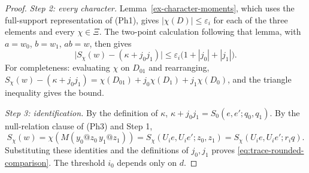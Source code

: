 \begin{proof}
\emph{Step 2: every character.} Lemma~\ref{ex-character-moments}, which
uses the full-support representation of (Ph1), gives
$|\chi(D)|\le\varepsilon_i$ for each of the three elements and every
$\chi\in\Xi$. The two-point calculation following that lemma, with
$a=w_0$, $b=w_1$, $ab=w$, then gives
\[
 \bigl|S_\chi(w)-(\kappa+j_0j_1)\bigr|
 \le\varepsilon_i\bigl(1+|j_0|+|j_1|\bigr).
\]
For completeness: evaluating $\chi$ on $D_{01}$ and rearranging,
$S_\chi(w)-(\kappa+j_0j_1)=\chi(D_{01})+j_0\chi(D_1)+j_1\chi(D_0)$, and
the triangle inequality gives the bound.

\emph{Step 3: identification.} By the definition of $\kappa$,
$\kappa+j_0j_1=S_0(e,e';q_0,q_1)$. By the null-relation clause of (Ph3)
and Step 1,
\[
 S_\chi(w)=\chi(M(y_0@z_0\,y_1@z_1))
 =S_\chi(U_ie,U_ie';z_0,z_1)=S_\chi(U_ie,U_ie';r_iq).
\]
Substituting these identities and the definitions of $j_0,j_1$ proves
\eqref{eq:trace-rounded-comparison}. The threshold $i_0$ depends only on
$d$.
\end{proof}

